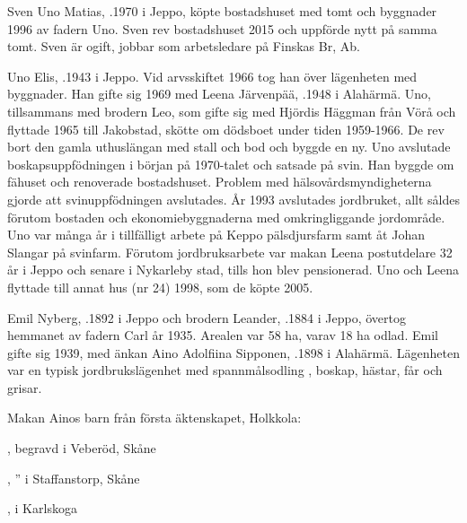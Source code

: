 Sven Uno Matias, .1970 i Jeppo, köpte bostadshuset med tomt och byggnader 1996 av fadern Uno. Sven rev bostadshuset 2015 och uppförde nytt på samma tomt. Sven är ogift, jobbar som arbetsledare på Finskas Br, Ab.


Uno Elis, .1943 i Jeppo.  Vid arvsskiftet 1966 tog han över lägenheten med byggnader. Han gifte sig 1969 med Leena Järvenpää, .1948 i Alahärmä.  Uno, tillsammans med brodern Leo, som gifte sig med Hjördis Häggman från Vörå och flyttade 1965 till Jakobstad, skötte om  dödsboet under tiden 1959-1966. De rev bort den gamla uthuslängan med stall och bod och byggde en ny.  Uno  avslutade boskapsuppfödningen i början på 1970-talet och satsade på svin.  Han byggde om fähuset och renoverade bostadshuset. Problem med hälsovårdsmyndigheterna gjorde att svinuppfödningen avslutades. År 1993 avslutades jordbruket, allt såldes förutom bostaden och ekonomiebyggnaderna med omkringliggande jordområde. Uno var många år i tillfälligt arbete på Keppo pälsdjursfarm samt åt Johan Slangar på svinfarm. Förutom jordbruksarbete var makan Leena postutdelare 32 år i Jeppo och senare i Nykarleby stad, tills hon blev pensionerad. Uno och Leena flyttade till annat hus (nr 24) 1998, som de köpte 2005.
  \begin{jhchildren}
    \item {}
    \item {}
    \item {}
  \end{jhchildren}


Emil Nyberg, .1892 i Jeppo och brodern Leander, .1884 i Jeppo, övertog hemmanet av fadern Carl år 1935. Arealen var 58 ha, varav 18 ha odlad.  Emil gifte sig 1939, med änkan Aino Adolfiina Sipponen, .1898 i Alahärmä. Lägenheten var en typisk jordbrukslägenhet med spannmålsodling , boskap, hästar, får och grisar.
\begin{jhchildren}
  \item {}
  \item {}
\end{jhchildren}
Makan Ainos barn från första äktenskapet, Holkkola:
\begin{jhchildren}
  \item {}, begravd i Veberöd, Skåne
  \item {}, '' i Staffanstorp, Skåne
  \item {}, i Karlskoga
\end{jhchildren}

